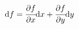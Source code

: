 \begin{equation}
    \mathrm{d}f = \cfrac{\partial f}{\partial x}\mathrm{d}x
                + \cfrac{\partial f}{\partial y}\mathrm{d}y
    \label{eq:differential}
\end{equation}

